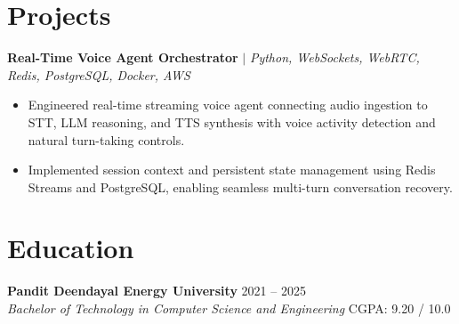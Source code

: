 \documentclass[10pt]{article}
\newcommand{\rItemList}{\begin{itemize}[leftmargin=1.1em, itemsep=1.0pt, topsep=1.0pt, parsep=0pt, label=\textbullet]}
\newcommand{\rEndItemList}{\end{itemize}}
\begin{document}
\section{Projects}

\textbf{Real-Time Voice Agent Orchestrator} $\vert$ \textit{Python, WebSockets, WebRTC, Redis, PostgreSQL, Docker, AWS} \\
\rItemList
\item Engineered real-time streaming voice agent connecting audio ingestion to STT, LLM reasoning, and TTS synthesis with voice activity detection and natural turn-taking controls.
\item Implemented session context and persistent state management using Redis Streams and PostgreSQL, enabling seamless multi-turn conversation recovery.
\rEndItemList

\section{Education}

\textbf{Pandit Deendayal Energy University} \hfill 2021 -- 2025 \\
\textit{Bachelor of Technology in Computer Science and Engineering} \hfill CGPA: 9.20 / 10.0
\end{document}
